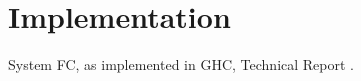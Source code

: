 \section{Implementation}

System FC, as implemented in GHC, Technical Report \citep{eisenberg2015system}.

